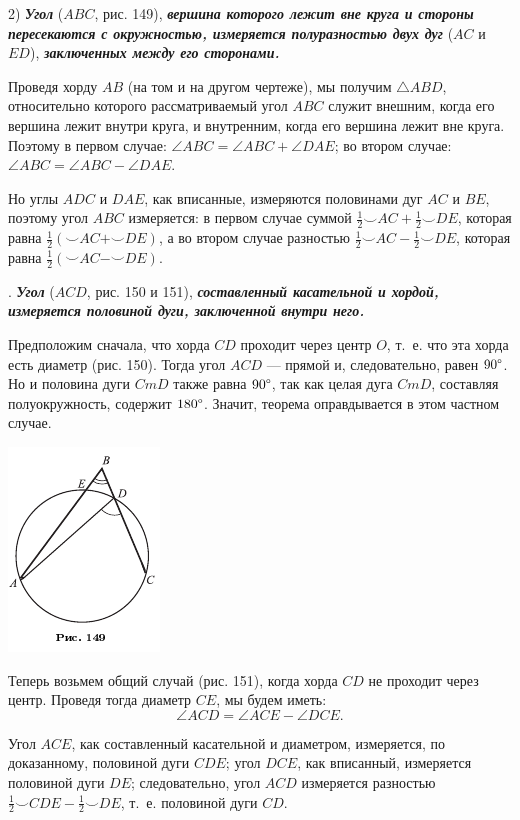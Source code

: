 \documentclass[oneside]{book}
\begin{document}
2) \textbf{\emph{Угол}} ($ABC$, рис. 149), \textbf{\emph{вершина которого лежит вне круга и стороны пересекаются с окружностью, измеряется полуразностью двух дуг}} ($AC$ и $ED$), \textbf{\emph{заключенных между его сторонами.}}

Проведя хорду $AB$ (на том и на другом чертеже), мы получим $\triangle ABD$, относительно которого рассматриваемый угол $ABC$ служит внешним, когда его вершина лежит внутри круга, и внутренним, когда его вершина лежит вне круга.
Поэтому в первом случае:
$\angle ABC = \angle ABC+\angle DAE$;
во втором случае:
$\angle ABC = \angle ABC-\angle DAE$.

Но углы $ADC$ и $DAE$, как вписанные, измеряются половинами дуг $AC$ и $BE$, поэтому угол $ABC$ измеряется:
в первом случае суммой
$\tfrac12{\smallsmile}AC+\tfrac12{\smallsmile}DE$, которая равна $\tfrac12({\smallsmile}AC+{\smallsmile}DE)$, а во втором случае разностью $\tfrac12{\smallsmile}AC-\tfrac12{\smallsmile}DE$, которая равна $\tfrac12({\smallsmile}AC-{\smallsmile}DE)$.

.
\textbf{\emph{Угол}} ($ACD$, рис. 150 и 151), \textbf{\emph{составленный касательной и хордой, измеряется половиной дуги, заключенной внутри него.}}

Предположим сначала, что хорда $CD$ проходит через центр $O$, т.~е. что эта хорда есть диаметр (рис. 150).
Тогда угол $ACD$ — прямой и,
следовательно, равен $90\degree$.
Но и половина дуги $CmD$ также равна $90\degree$, так как целая дуга $CmD$, составляя полуокружность, содержит $180\degree$.
Значит, теорема оправдывается в этом частном случае.

\includegraphics{pics/ris-149}

Теперь возьмем общий случай (рис. 151), когда хорда $CD$ не проходит через центр.
Проведя тогда диаметр $CE$, мы будем иметь:
\[\angle ACD = \angle ACE - \angle DCE.\]

Угол $ACE$, как составленный касательной и диаметром, измеряется, по доказанному, половиной дуги $CDE$;
угол $DCE$, как вписанный, измеряется половиной дуги $DE$;
следовательно, угол $ACD$ измеряется разностью $\tfrac12{\smallsmile}CDE-\tfrac12{\smallsmile}DE$, т.~е. половиной дуги $CD$.
\end{document}
